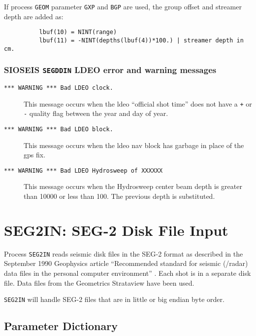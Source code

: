 If process \texttt{GEOM} parameter \texttt{GXP} and \texttt{BGP} are used, the group offset and
streamer depth are added as:
\begin{verbatim}
          lbuf(10) = NINT(range)
          lbuf(11) = -NINT(depths(lbuf(4))*100.) | streamer depth in cm.
\end{verbatim}

\subsubsection{SIOSEIS \texttt{SEGDDIN} LDEO error and warning messages}

\begin{description}
    \item[\texttt{***  WARNING  ***  Bad LDEO clock.}]
    This message occurs when the \gls{ldeo} ``official shot time'' does not have a \texttt{+} or \texttt{-} quality flag between the year and day of year.

\item[\texttt{***  WARNING  ***  Bad LDEO block.}]
    This message occurs when the \gls{ldeo} nav block has garbage in place of the \gls{gps} fix.

\item[\texttt{***  WARNING  ***  Bad LDEO Hydrosweep of XXXXXX}]
    This message occurs when the Hydrosweep center beam depth is greater than 10000 or less than 100.  The previous depth is substituted.
\end{description}

\section{SEG2IN: SEG-2 Disk File Input}
\label{cmd_seg2in}

Process \texttt{SEG2IN} reads seismic disk files in the SEG-2 format as described in
the September 1990 Geophysics article ``Recommended standard for seismic
(/radar) data files in the personal computer environment'' \cite{SEG_2_1990}.
Each \gls{shot} is in a separate disk file.  Data files from
the Geometrics Strataview have been used.

\texttt{SEG2IN} will handle SEG-2 files that are in little or big endian
byte order.

\subsection{Parameter Dictionary}

